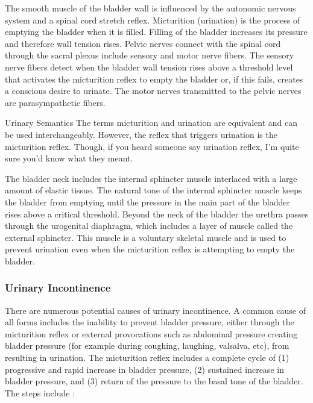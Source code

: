 The smooth muscle of the bladder wall is influenced by the autonomic nervous system and a spinal cord stretch reflex. Micturition (urination) is the process of emptying the bladder when it is filled. Filling of the bladder increases its pressure and therefore wall tension rises. Pelvic nerves connect with the spinal cord through the sacral plexus include sensory and motor nerve fibers. The sensory nerve fibers detect when the bladder wall tension rises above a threshold level that activates the micturition reflex to empty the bladder or, if this fails, creates a conscious desire to urinate. The motor nerves transmitted to the pelvic nerves are parasympathetic fibers.

\begin{backgroundinformation}{Urinary Semantics}
    The terms micturition and urination are equivalent and can be used interchangeably. However, the reflex that triggers urination is the micturition reflex. Though, if you heard someone say urination reflex, I'm quite sure you'd know what they meant.
\end{backgroundinformation}

The bladder neck includes the internal sphincter muscle interlaced with a large amount of elastic tissue. The natural tone of the internal sphincter muscle keeps the bladder from emptying until the pressure in the main part of the bladder rises above a critical threshold. Beyond the neck of the bladder the urethra passes through the urogenital diaphragm, which includes a layer of muscle called the external sphincter. This muscle is a voluntary skeletal muscle and is used to prevent urination even when the micturition reflex is attempting to empty the bladder.

\subsubsection{Urinary Incontinence}

There are numerous potential causes of urinary incontinence. A common cause of all forms includes the inability to prevent bladder pressure, either through the micturition reflex or external provocations such as abdominal pressure creating bladder pressure (for example during coughing, laughing, valsalva, etc), from resulting in urination. The micturition reflex includes a complete cycle of (1) progressive and rapid increase in bladder pressure, (2) sustained increase in bladder pressure, and (3) return of the pressure to the basal tone of the bladder. 
\vspace{4mm}
The steps include \cite{hall_guyton_2020}:

